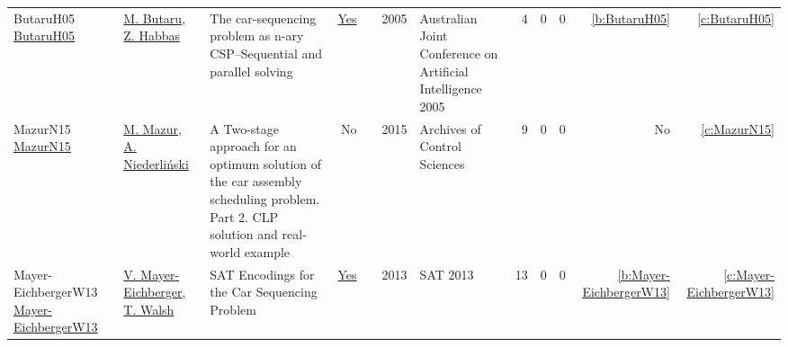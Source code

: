 {\begin{longtable}{>{\raggedright\arraybackslash}p{3cm}>{\raggedright\arraybackslash}p{6cm}>{\raggedright\arraybackslash}p{6.5cm}rrrp{2.5cm}rrrrr}
ButaruH05 \href{}{ButaruH05} & \hyperref[auth:a29]{M. Butaru}, \hyperref[auth:a30]{Z. Habbas} & The car-sequencing problem as n-ary CSP--Sequential and parallel solving & \href{cars/works/ButaruH05.pdf}{Yes} & \cite{ButaruH05} & 2005 & Australian Joint Conference on Artificial Intelligence 2005 & 4 & 0 & 0 & \ref{b:ButaruH05} & \ref{c:ButaruH05}\\
MazurN15 \href{}{MazurN15} & \hyperref[auth:a31]{M. Mazur}, \hyperref[auth:a32]{A. Niederli{\'n}ski} & A Two-stage approach for an optimum solution of the car assembly scheduling problem. Part 2. CLP solution and real-world example & No & \cite{MazurN15} & 2015 & Archives of Control Sciences & 9 & 0 & 0 & No & \ref{c:MazurN15}\\
Mayer-EichbergerW13 \href{https://doi.org/10.29007/jrsp}{Mayer-EichbergerW13} & \hyperref[auth:a35]{V. Mayer{-}Eichberger}, \hyperref[auth:a36]{T. Walsh} & {SAT} Encodings for the Car Sequencing Problem & \href{cars/works/Mayer-EichbergerW13.pdf}{Yes} & \cite{Mayer-EichbergerW13} & 2013 & SAT 2013 & 13 & 0 & 0 & \ref{b:Mayer-EichbergerW13} & \ref{c:Mayer-EichbergerW13}\\
\end{longtable}
}

